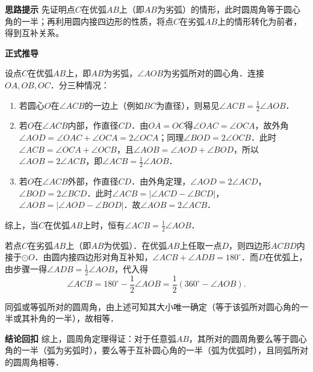 \begin{proofbox}
	\textbf{\textcolor{CProof}{思路提示}}
	先证明点$C$在优弧$AB$上（即$AB$为劣弧）的情形，此时圆周角等于圆心角的一半；再利用圆内接四边形的性质，将点$C$在劣弧$AB$上的情形转化为前者，得到互补关系。

	\medskip
	\textbf{\textcolor{CProof}{正式推导}}
	\begin{description}[style=nextline, leftmargin=2.8em, labelsep=0.5em, itemsep=0.55em]
		\item[\textbf{步骤一（劣弧情形）：}]
			设点$C$在优弧$AB$上，即$AB$为劣弧，$\angle AOB$为劣弧所对的圆心角．连接$OA,OB,OC$．分三种情况：
			\begin{enumerate}[leftmargin=*, itemsep=0.3em]
			\item 若圆心$O$在$\angle ACB$的一边上（例如$BC$为直径），则易见$\angle ACB = \frac12\angle AOB$．
			\item 若$O$在$\angle ACB$内部，作直径$CD$．由$OA=OC$得$\angle OAC=\angle OCA$，故外角$\angle AOD = \angle OAC+\angle OCA = 2\angle OCA$；同理$\angle BOD = 2\angle OCB$．此时$\angle ACB = \angle OCA+\angle OCB$，且$\angle AOB = \angle AOD+\angle BOD$，所以$\angle AOB = 2\angle ACB$，即$\angle ACB = \frac12\angle AOB$．
			\item 若$O$在$\angle ACB$外部，作直径$CD$．由外角定理，$\angle AOD = 2\angle ACD$，$\angle BOD = 2\angle BCD$．此时$\angle ACB = |\angle ACD - \angle BCD|$，$\angle AOB = |\angle AOD - \angle BOD|$．故$\angle AOB = 2\angle ACB$．
		\end{enumerate}
			综上，当$C$在优弧$AB$上时，恒有$\angle ACB = \frac12\angle AOB$．
		\item[\textbf{步骤二（优弧情形转化）：}]
			若点$C$在劣弧$AB$上（即$AB$为优弧）．在优弧$AB$上任取一点$D$，则四边形$ACBD$内接于$\odot O$．由圆内接四边形对角互补知，$\angle ACB + \angle ADB = 180^\circ$．而$D$在优弧上，由步骤一得$\angle ADB = \frac12\angle AOB$，代入得
			\[
				\angle ACB = 180^\circ - \frac12\angle AOB = \frac12(360^\circ - \angle AOB).
			\]
		\item[\textbf{步骤三（等弧等角）：}]
			同弧或等弧所对的圆周角，由上述可知其大小唯一确定（等于该弧所对圆心角的一半或其补角的一半），故相等．
	\end{description}

	\medskip
	\textbf{\textcolor{CProof}{结论回扣}}
	综上，圆周角定理得证：对于任意弧$AB$，其所对的圆周角要么等于圆心角的一半（弧为劣弧时），要么等于互补圆心角的一半（弧为优弧时），且同弧所对的圆周角相等．
\end{proofbox}
